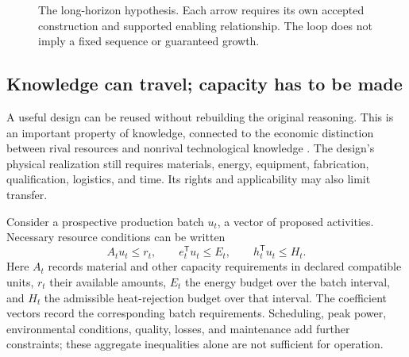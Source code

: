 \begin{figure}[htbp]
\centering
{}
\caption{The long-horizon hypothesis. Each arrow requires its own accepted construction and supported enabling relationship. The loop does not imply a fixed sequence or guaranteed growth.}
\end{figure}

\subsection{Knowledge can travel; capacity has to be made}

A useful design can be reused without rebuilding the original reasoning. This is an important property of knowledge, connected to the economic distinction between rival resources and nonrival technological knowledge \citep{romer1990}. The design's physical realization still requires materials, energy, equipment, fabrication, qualification, logistics, and time. Its rights and applicability may also limit transfer.

Consider a prospective production batch $u_t$, a vector of proposed activities. Necessary resource conditions can be written
\begin{equation}
A_tu_t\le r_t,\qquad e_t^{\mathsf T}u_t\le E_t,\qquad
h_t^{\mathsf T}u_t\le H_t.
\label{eq:physical}
\end{equation}
Here $A_t$ records material and other capacity requirements in declared compatible units, $r_t$ their available amounts, $E_t$ the energy budget over the batch interval, and $H_t$ the admissible heat-rejection budget over that interval. The coefficient vectors record the corresponding batch requirements. Scheduling, peak power, environmental conditions, quality, losses, and maintenance add further constraints; these aggregate inequalities alone are not sufficient for operation.

